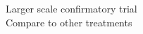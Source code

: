 \documentclass[preview]{standalone}
\begin{document}
Larger scale confirmatory trial\\Compare to other treatments\\
\end{document}
